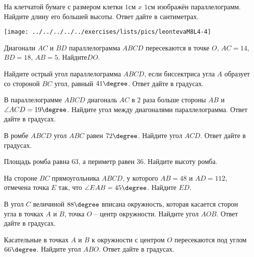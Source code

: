 \begin{class}[number=4]
\begin{listofex}
\begin{minipage}[t]{\bodywidth}
			На клетчатой бумаге с размером клетки \( 1 \)см \( x \) \( 1 \)см изображён параллелограмм. Найдите длину его большей высоты. Ответ дайте в сантиметрах.
		\end{minipage}
		\hspace{0.02\linewidth}
		\begin{minipage}[t]{\picwidth}
			\texttt{[image: ../../../../../exercises/lists/pics/leontevaM8L4-4]}
		\end{minipage} 
		\item Диагонали \( AC \) и \( BD \) параллелограмма \( ABCD \) пересекаются в точке \( O \), \( AC  =  14 \), \( BD  =  18 \), \( AB  =  5 \). Найдите\(  DO \).
		\item Найдите острый угол параллелограмма \( ABCD \), если биссектриса угла \( A \) образует со стороной \( BC \) угол, равный \( 41\degree \). Ответ дайте в градусах.
		\item В параллелограмме \( ABCD \) диагональ \( AC \) в \( 2 \) раза больше стороны \( AB \) и \( \angle ACD=19\degree \). Найдите угол между диагоналями параллелограмма. Ответ дайте в градусах.
		\item В ромбе \( ABCD \) угол \( ABC \) равен \( 72\degree \). Найдите угол \( ACD \). Ответ дайте в градусах.
		\item Площадь ромба равна \( 63 \), а периметр равен \( 36 \). Найдите высоту ромба.
		\item На стороне \( BC \) прямоугольника \( ABCD \), у которого \( AB = 48 \) и \( AD = 112 \), отмечена точка \(  E \) так, что \( \angle EAB = 45\degree \). Найдите \( ED \).
		\item В угол \( C \) величиной \( 88\degree \) вписана окружность, которая касается сторон угла в точках \( A \) и \( B \), точка \( O \) – центр окружности. Найдите угол \( AOB \). Ответ дайте в градусах.
		\item Касательные в точках \( A \) и \( B \) к окружности с центром \( O \) пересекаются под углом \( 66\degree \). Найдите угол \( ABO \). Ответ дайте в градусах.
	\end{listofex}
\end{class}

